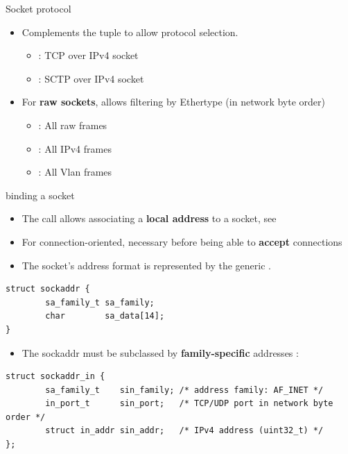\begin{frame}{Socket protocol}
	\vspace{1cm}
	\begin{itemize}
		\item Complements the tuple  to allow protocol selection.
			\begin{itemize}
				\item {} : TCP over IPv4 socket
				\item {} : SCTP over IPv4 socket
			\end{itemize}
		\item For \textbf{raw sockets}, allows filtering by Ethertype (in network byte order)
			\begin{itemize}
				\item {} : All raw frames
				\item {} : All IPv4 frames
				\item {} : All Vlan frames
			\end{itemize}


	\end{itemize}
\end{frame}

\begin{frame}[fragile]{binding a socket}
	\begin{itemize}
		\item The  call allows associating a \textbf{local address} to a socket, see 
		\item For connection-oriented, necessary before being able to \textbf{accept} connections
		\item The socket's address format is represented by the generic .
	\end{itemize}
		\begin{verbatim}
struct sockaddr {
        sa_family_t sa_family;
        char        sa_data[14];
}
		\end{verbatim}
	\begin{itemize}
		\item The sockaddr must be subclassed by \textbf{family-specific} addresses :
	\end{itemize}

		\begin{verbatim}
struct sockaddr_in {
        sa_family_t    sin_family; /* address family: AF_INET */
        in_port_t      sin_port;   /* TCP/UDP port in network byte order */
        struct in_addr sin_addr;   /* IPv4 address (uint32_t) */
};
		\end{verbatim}

\end{frame}

